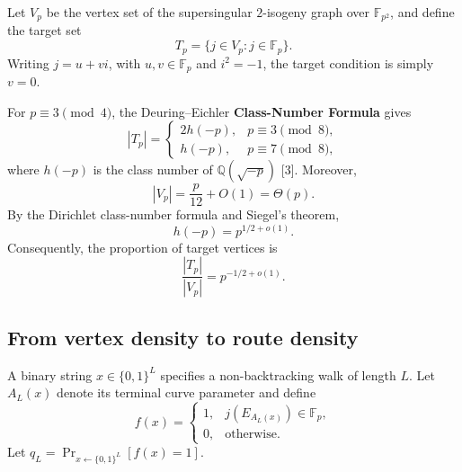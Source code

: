 \documentclass[10pt,a4paper]{article}
\begin{document}
Let \(V_p\) be the vertex set of the supersingular \(2\)-isogeny
graph over \(\mathbb F_{p^2}\), and define the target set
\[
T_p=\{j\in V_p:j\in\mathbb F_p\}.
\]
Writing \(j=u+vi\), with \(u,v\in\mathbb F_p\) and \(i^2=-1\),
the target condition is simply \(v=0\).

For \(p\equiv3\pmod4\), the Deuring--Eichler
\textbf{Class-Number Formula} gives
\[
|T_p|=
\begin{cases}
2h(-p),&p\equiv3\pmod8,\\
h(-p),&p\equiv7\pmod8,
\end{cases}
\]
where \(h(-p)\) is the class number of
\(\mathbb Q(\sqrt{-p})\) [3]. Moreover,
\[
|V_p|=\frac p{12}+O(1)=\Theta(p).
\]
By the Dirichlet class-number formula and Siegel's theorem,
\[
h(-p)=p^{1/2+o(1)}.
\]
Consequently, the proportion of target vertices is
\[
\boxed{\frac{|T_p|}{|V_p|}=p^{-1/2+o(1)}.}
\]

\subsection*{From vertex density to route density}

A binary string \(x\in\{0,1\}^L\) specifies a
non-backtracking walk of length \(L\). Let \(A_L(x)\) denote
its terminal curve parameter and define
\[
f(x)=
\begin{cases}
1,&j(E_{A_L(x)})\in\mathbb F_p,\\
0,&\text{otherwise}.
\end{cases}
\]
Let \(q_L=\Pr_{x\leftarrow\{0,1\}^L}[f(x)=1]\).
\end{document}
